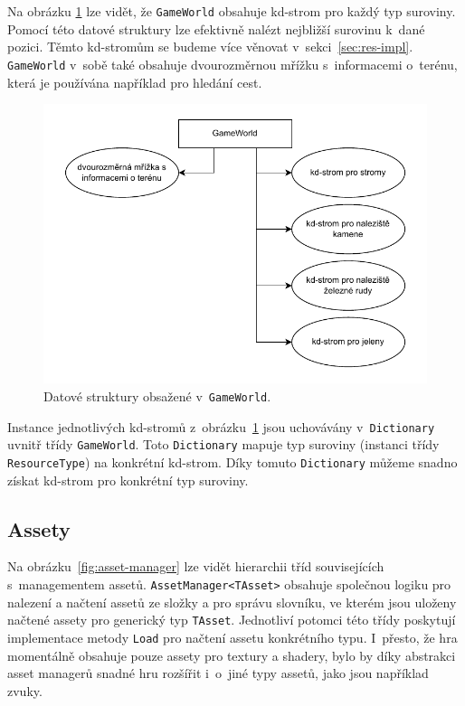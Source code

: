 Na obrázku \ref{fig:game-world} lze vidět, že \texttt{GameWorld} obsahuje kd-strom pro každý typ suroviny. Pomocí této datové struktury lze efektivně nalézt nejbližší surovinu k~dané pozici. Těmto kd-stromům se budeme více věnovat v~sekci~\ref{sec:res-impl}. \texttt{GameWorld} v~sobě také obsahuje dvourozměrnou mřížku s~informacemi o~terénu, která je používána například pro hledání cest.

\begin{figure}[!htb]
  \centering
  \includegraphics[width=0.8\linewidth]{img/game-world.pdf}
  \caption{Datové struktury obsažené v~\texttt{GameWorld}.}
  \label{fig:game-world}
\end{figure}

Instance jednotlivých kd-stromů z~obrázku~\ref{fig:game-world} jsou uchovávány v~\texttt{Dictionary} uvnitř třídy \texttt{GameWorld}. Toto \texttt{Dictionary} mapuje typ suroviny (instanci třídy \texttt{ResourceType}) na konkrétní kd-strom. Díky tomuto \texttt{Dictionary} můžeme snadno získat kd-strom pro konkrétní typ suroviny.

\subsection{Assety}
Na obrázku~\ref{fig:asset-manager} lze vidět hierarchii tříd souvisejících s~managementem assetů. \texttt{AssetManager<TAsset>} obsahuje společnou logiku pro nalezení a načtení assetů ze složky a pro správu slovníku, ve kterém jsou uloženy načtené assety pro generický typ \texttt{TAsset}. Jednotliví potomci této třídy poskytují implementace metody \texttt{Load} pro načtení assetu konkrétního typu. I~přesto, že hra momentálně obsahuje pouze assety pro textury a shadery, bylo by díky abstrakci asset managerů snadné hru rozšířit i~o~jiné typy assetů, jako jsou například zvuky.

